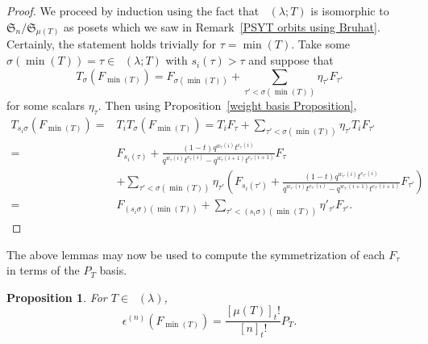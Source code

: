 \documentclass[10pt,a4paper]{amsart}
\numberwithin{equation}{section}
\newtheorem{Proposition}[Theorem]{Proposition}
\theoremstyle{definition}
\DeclareMathOperator{\PSYT}{\mathrm{PSYT}_{\geq 0}}
\DeclareMathOperator{\RSSYT}{\mathrm{RSSYT}_{\geq 0}}
\DeclareMathOperator{\Min}{\mathrm{min}}
\begin{document}
\begin{proof}
 We proceed by induction using the fact that $\PSYT(\lambda;T)$ is isomorphic to $\mathfrak{S}_n/\mathfrak{S}_{\mu(T)}$ as posets which we saw in Remark~\ref{PSYT orbits using Bruhat}. Certainly, the statement holds trivially for $\tau = \Min(T)$. Take some $\sigma(\Min(T)) = \tau \in \PSYT(\lambda;T)$ with $s_i(\tau) > \tau$ and suppose that
 \[
 T_{\sigma}(F_{\Min(T)}) = F_{\sigma(\Min(T))} + \sum_{\tau' < \sigma(\Min(T))} \eta_{\tau'} F_{\tau'}
 \]
 for some scalars $\eta_{\tau}$.
 Then using Proposition~\ref{weight basis Proposition},
 \begin{align*}
 T_{s_i\sigma}(F_{\Min(T)})
 ={}& T_iT_{\sigma}(F_{\Min(T)})
 = T_iF_{\tau} + \sum_{\tau' < \sigma(\Min(T))} \eta_{\tau'} T_iF_{\tau'} \\
 ={}& F_{s_i(\tau)} + \frac{(1-t)q^{w_{\tau}(i)}t^{c_{\tau}(i)}}{q^{w_{\tau}(i)}t^{c_{\tau}(i)} - q^{w_{\tau}(i+1)}t^{c_{\tau}(i+1)}} F_{\tau} \\
 & + \sum_{\tau' < \sigma(\Min(T))} \eta_{\tau'} \left(F_{s_i(\tau')} + \frac{(1-t)q^{w_{\tau'}(i)}t^{c_{\tau'}(i)}}{q^{w_{\tau'}(i)}t^{c_{\tau'}(i)} - q^{w_{\tau'}(i+1)}t^{c_{\tau'}(i+1)}} F_{\tau'} \right) \\
 ={}& F_{(s_i\sigma)(\Min(T))} + \sum_{\tau' < (s_i\sigma)(\Min(T))}\eta'_{\tau'} F_{\tau'}. \tag*{\qed}
 \end{align*} \renewcommand{\qed}{}
\end{proof}

The above lemmas may now be used to compute the symmetrization of each $F_{\tau}$ in terms of the $P_{T}$ basis.

\begin{Proposition}\label{sym Macd coeff for symmetrization of lowest term}
 For $T \in \RSSYT(\lambda)$,
 \[
 \epsilon^{(n)}(F_{\Min(T)}) = \frac{[\mu(T)]_{t}!}{[n]_{t}!}P_T.
 \]

\end{Proposition}
\end{document}

